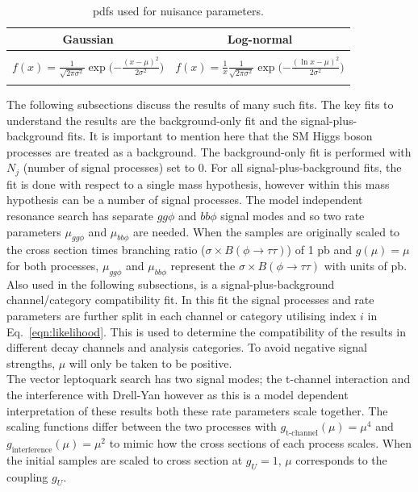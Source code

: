 \begin{table}[!hbtp]
    \centering
    \begin{tabular}{|c|c|}
         \hline
         Gaussian & Log-normal  \\
         \hline
         \hline
          & \\
         $f(x) = \frac{1}{\sqrt{2\pi\sigma^{2}}} \exp\Big({-\frac{(x - \mu)^2}{2\sigma^2}}\Big)$ & $f(x) = \frac{1}{x} \frac{1}{\sqrt{2\pi\sigma^{2}}} \exp\Big({-\frac{(\ln x - \mu)^2}{2\sigma^2}}\Big)$ \\
          & \\
         \hline
    \end{tabular}
    \caption{pdfs used for nuisance parameters.}
    \label{tab:pdfs}
\end{table}

The following subsections discuss the results of many such fits.
The key fits to understand the results are the background-only fit and the signal-plus-background fits.
It is important to mention here that the SM Higgs boson processes are treated as a background.
The background-only fit is performed with $N_j$ (number of signal processes) set to 0.
For all signal-plus-background fits, the fit is done with respect to a single mass hypothesis, however within this mass hypothesis can be a number of signal processes.
The model independent resonance search has separate $gg\phi$ and $bb\phi$ signal modes and so two rate parameters $\mu_{gg\phi}$ and $\mu_{bb\phi}$ are needed.
When the samples are originally scaled to the cross section times branching ratio ($\sigma \times B (\phi\rightarrow\tau\tau)$) of 1 pb and $g(\mu)=\mu$ for both processes, $\mu_{gg\phi}$ and $\mu_{bb\phi}$ represent the $\sigma \times B (\phi\rightarrow\tau\tau)$ with units of pb.
Also used in the following subsections, is a signal-plus-background channel/category compatibility fit.
In this fit the signal processes and rate parameters are further split in each channel or category utilising index $i$ in Eq.~\ref{eqn:likelihood}.
This is used to determine the compatibility of the results in different decay channels and analysis categories.
To avoid negative signal strengths, $\mu$ will only be taken to be positive. \\

The vector leptoquark search has two signal modes; the t-channel interaction and the interference with Drell-Yan however as this is a model dependent interpretation of these results both these rate parameters scale together.
The scaling functions differ between the two processes with $g_{\text{t-channel}}(\mu) = \mu^4$ and $g_{\text{interference}}(\mu) = \mu^2$ to mimic how the cross sections of each process scales.
When the initial samples are scaled to cross section at $g_{U}=1$, $\mu$ corresponds to the coupling $g_{U}$. \\

